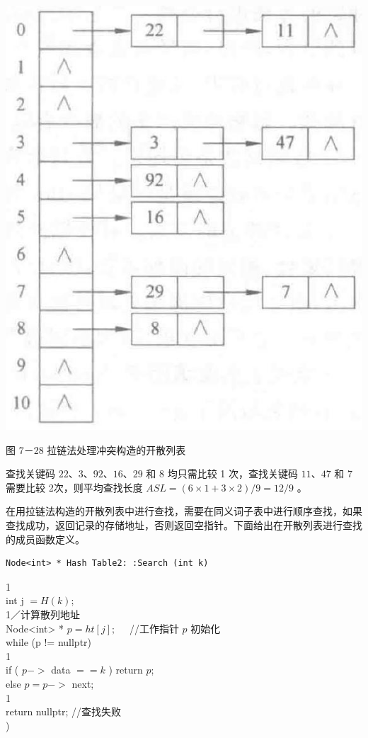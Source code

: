 \documentclass[10pt]{article}
\begin{document}
\begin{center}
\includegraphics[max width=\textwidth]{2025_06_06_704745ea57b15b2333e5g-258}
\end{center}

图 7－28 拉链法处理冲突构造的开散列表

查找关键码 $22 、 3 、 92 、 16 、 29$ 和 8 均只需比较 1 次，查找关键码 $11 、 47$ 和 7 需要比较 2次，则平均查找长度 $A S L=(6 \times 1+3 \times 2) / 9=12 / 9$ 。

在用拉链法构造的开散列表中进行查找，需要在同义词子表中进行顺序查找，如果查找成功，返回记录的存储地址，否则返回空指针。下面给出在开散列表进行查找的成员函数定义。

\begin{verbatim}
Node<int> * Hash Table2: :Search (int k)
\end{verbatim}

1\\
int j $=H(k)$;\\
1／计算散列地址\\
Node<int> * $p=h t[j] ; \quad$ //工作指针 $p$ 初始化\\
while (p != nullptr)\\
1\\
if ( $p->$ data $==k$ ) return $p$;\\
else $p=p->$ next;\\
1\\
return nullptr; //查找失败\\
)
\end{document}
